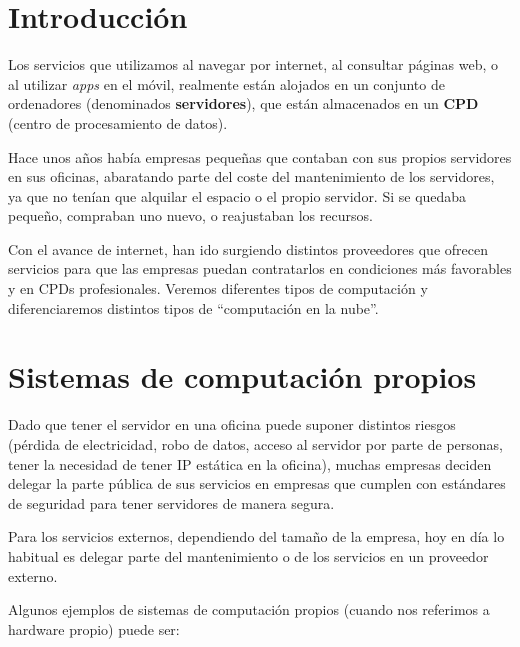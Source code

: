 \chapter{Introducción}

Los servicios que utilizamos al navegar por internet, al consultar páginas web, o al utilizar \textit{apps} en el móvil, realmente están alojados en un conjunto de ordenadores (denominados \textbf{servidores}), que están almacenados en un \textbf{CPD} (centro de procesamiento de datos).

Hace unos años había empresas pequeñas que contaban con sus propios servidores en sus oficinas, abaratando parte del coste del mantenimiento de los servidores, ya que no tenían que alquilar el espacio o el propio servidor. Si se quedaba pequeño, compraban uno nuevo, o reajustaban los recursos.

Con el avance de internet, han ido surgiendo distintos proveedores que ofrecen servicios para que las empresas puedan contratarlos en condiciones más favorables y en CPDs profesionales. Veremos diferentes tipos de computación y diferenciaremos distintos tipos de “computación en la nube”.



\chapter{Sistemas de computación propios}
Dado que tener el servidor en una oficina puede suponer distintos riesgos (pérdida de electricidad, robo de datos, acceso al servidor por parte de personas, tener la necesidad de tener IP estática en la oficina), muchas empresas deciden delegar la parte pública de sus servicios en empresas que cumplen con estándares de seguridad para tener servidores de manera segura.


Para los servicios externos, dependiendo del tamaño de la empresa, hoy en día lo habitual es delegar parte del mantenimiento o de los servicios en un proveedor externo.

Algunos ejemplos de sistemas de computación propios (cuando nos referimos a hardware propio) puede ser:

